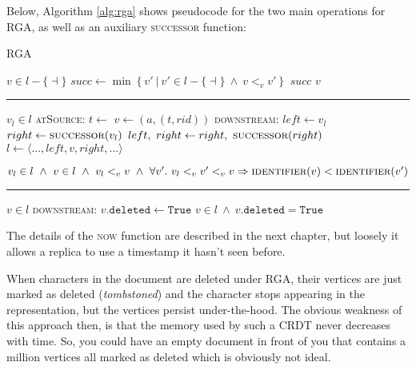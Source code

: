 \documentclass[diss.tex]{subfiles}
\begin{document}
\noindent
Below, Algorithm \ref{alg:rga} shows pseudocode for the two main operations for RGA, as well as an auxiliary \textsc{successor} function:
\begin{algorithm}[H]
\caption{RGA}
\label{alg:rga}
\begin{algorithmic}[1]
\Require $v \in l - \{\dashv\}$
 
\State $succ \gets \min \left\{ v' ~|~ v' \in l -\{\dashv\} ~\wedge~ v <_v v'  \right\}$
\State \Return $succ$
\Else
\State \Return $v$
\EndIf
\EndFunction
\end{algorithmic}

\hrule

\begin{algorithmic}[1]
\Require $v_l \in l$
 
\BState \textsc{atSource}:
\State $t \gets$  
\State $v \gets (a,(t, rid))$ 
\BState \textsc{downstream}:
\State $left \gets v_l$
\State $right \gets \Call{successor}{v_l}$
\State $left,~right \gets right, ~\Call{successor}{right}$
\EndWhile
\State $l \gets \langle ..., left, v, right, ...\rangle$
\EndFunction

\Ensure $v_l \in l ~\wedge~ v \in l ~\wedge~ v_l <_v v ~\wedge~ \forall v'.~ v_l<_v v'<_v v \Rightarrow \textsc{identifier}(v) < \textsc{identifier}(v')$
\end{algorithmic}

\hrule

\begin{algorithmic}[1]
\Require $v \in l$
 
\BState \textsc{downstream}:
\State $v.\mathtt{deleted} \gets \mathtt{True}$
\EndFunction
\Ensure $v \in l ~\wedge~ v.\texttt{deleted} = \mathtt{True}$
\end{algorithmic}
\end{algorithm}

The details of the \textsc{now} function are described in the next chapter, but loosely it allows a replica to use a timestamp it hasn't seen before.

When characters in the document are deleted under RGA, their vertices are just marked as deleted (\textit{tombstoned}) and the character stops appearing in the representation, but the vertices persist under-the-hood. The obvious weakness of this approach then, is that the memory used by such a CRDT never decreases with time. So, you could have an empty document in front of you that contains a million vertices all marked as deleted which is obviously not ideal.
\end{document}
